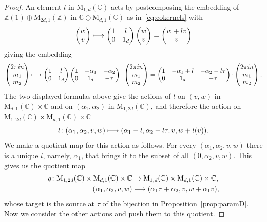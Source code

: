 \documentclass[JEP,XML,SOM,Unicode,NoFloatCountersInSection]{cedram}
\def\mto{\mathchoice{\longmapsto}{\mapsto}{\mapsto}{\mapsto}}
\theoremstyle{plain}
\theoremstyle{definition}
\numberwithin{equation}{subsection}
\renewcommand{\C}{\mathbb C}
\newcommand{\Z}{\mathbb Z}
\newcommand{\rmM}{\mathrm{M}}
\begin{document}
\begin{proof}
An element $l$ in $\rmM_{1,d}(\C)$ acts by postcomposing the embedding
of $\Z(1)\oplus\rmM_{2d,1}(\Z)$ in $\C\oplus \rmM_{d,1}(\C)$ as
in~\eqref{eq:cokernels} with
\[
\begin{pmatrix}
w \\v
\end{pmatrix}
\mto
\begin{pmatrix}
1 & l\\0 &1_d
\end{pmatrix}
\begin{pmatrix}
w \\v
\end{pmatrix}
=
\begin{pmatrix}
w +lv\\v
\end{pmatrix}
\]
giving the embedding
\[
\begin{pmatrix}
2\pi in\\ m_1\\ m_2
\end{pmatrix}
 \mto
\begin{pmatrix}
1 & l\\0 & 1_d
\end{pmatrix}
\begin{pmatrix}
1 & -\alpha_1 & -\alpha_2\\0 & 1_d & -\tau
\end{pmatrix}{\cdot}
\begin{pmatrix}
2\pi in\\ m_1\\ m_2
\end{pmatrix} %
 =
\begin{pmatrix}
1 & -\alpha_1+l & -\alpha_2-l\tau\\0 & 1_d & -\tau
\end{pmatrix}{\cdot}
\begin{pmatrix}
2\pi in\\ m_1\\ m_2
\end{pmatrix}.
\]
The two displayed formulas above give the actions of $l$ on $(v,w)$ in
$\rmM_{d,1}(\C)\times\C$ and on $(\alpha_1,\alpha_2)$ in
$\rmM_{1,2d}(\C)$, and therefore the action on
$\rmM_{1,2d}(\C)\times\rmM_{d,1}(\C)\times\C$
\[
l\colon (\alpha_1,\alpha_2,v,w)\mto (\alpha_1-l,\alpha_2+l\tau,v,w+l(v)).
\]
We make a quotient map for this action as follows. For every
$(\alpha_1,\alpha_2,v,w)$ there is a unique $l$, namely, $\alpha_1$,
that brings it to the subset of all $(0,\alpha_2,v,w)$. This gives us
the quotient map
\[
\begin{aligned}
q\colon  \rmM_{1,2d}(\C)\times\rmM_{d,1}(\C)\times\C &\to
\rmM_{1,d}(\C)\times\rmM_{d,1}(\C)\times\C,\\
 (\alpha_1,\alpha_2,v,w)&\mto (\alpha_1\tau+\alpha_2,v,w+\alpha_1v),
\end{aligned}
\]
whose target is the source at $\tau$ of the bijection in Proposition~\ref{prop:paramD}.
Now we consider the other actions and push them to this quotient.


\end{proof}
\end{document}
